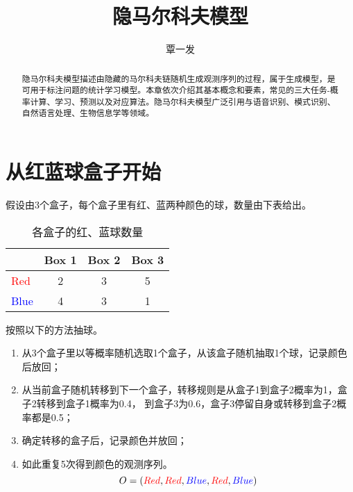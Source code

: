 \documentclass[]{article}
\title{隐马尔科夫模型}
\author{覃一发}
\begin{document}
\maketitle

\begin{abstract}
    隐马尔科夫模型描述由隐藏的马尔科夫链随机生成观测序列的过程，属于生成模型，是可用于标注问题的统计学习模型。本章依次介绍其基本概念和要素，常见的三大任务-概率计算、学习、预测以及对应算法。隐马尔科夫模型广泛引用与语音识别、模式识别、自然语言处理、生物信息学等领域。
\end{abstract}

\section{从红蓝球盒子开始}
    假设由3个盒子，每个盒子里有红、蓝两种颜色的球，数量由下表给出。
    \begin{table}[!h]
    	\begin{center}
    		\caption{各盒子的红、蓝球数量}
    		\begin{tabular}{l|ccc}
    			\hline
    			\quad & \textbf{Box 1} & \textbf{Box 2} & \textbf{Box 3}\\
    			\hline
    			\textcolor{red}{Red} & 2 & 3 & 5 \\
    			\hline
    			\textcolor{blue}{Blue} & 4 & 3 & 1 \\
    			\hline
    		\end{tabular}	
    	\end{center}
	\end{table}
    
    按照以下的方法抽球。
    \begin{enumerate}
    	\item 从3个盒子里以等概率随机选取1个盒子，从该盒子随机抽取1个球，记录颜色后放回； 
    	\item 从当前盒子随机转移到下一个盒子，转移规则是从盒子1到盒子2概率为1，盒子2转移到盒子1概率为0.4， 到盒子3为0.6，盒子3停留自身或转移到盒子2概率都是0.5；
    	\item 确定转移的盒子后，记录颜色并放回；
    	\item 如此重复5次得到颜色的观测序列。
    	\begin{equation}
    		O=(\textcolor{red}{Red},\textcolor{red}{Red},\textcolor{blue}{Blue},\textcolor{red}{Red},\textcolor{blue}{Blue})
    	\end{equation}
    \end{enumerate}
 
\end{document}
